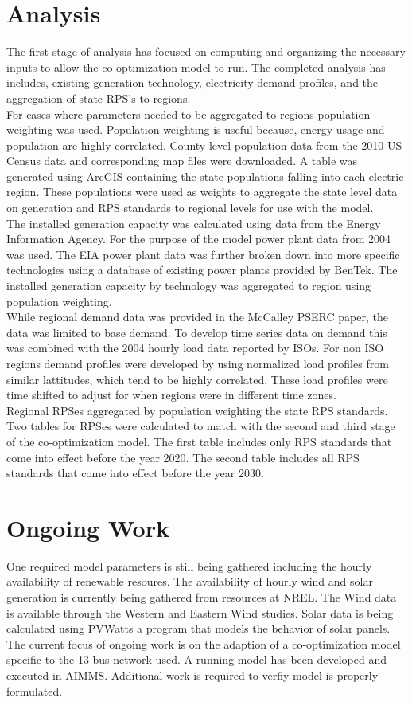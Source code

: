 \documentclass[oneside,12pt]{report}
\begin{document}
\chapter{Analysis}
The first stage of analysis has focused on computing and organizing the necessary inputs to allow the co-optimization model to run. The completed analysis has includes, existing generation technology, electricity demand profiles, and the aggregation of state RPS's to regions. 
\\For cases where parameters needed to be aggregated to regions population weighting was used. Population weighting is useful because, energy usage and population are highly correlated. County level population data from the 2010 US Census data and corresponding map files were downloaded. A table was generated using ArcGIS containing the state populations falling into each electric region. These populations were used as weights to aggregate the state level data on generation and RPS standards to regional levels for use with the model.
\\The installed generation capacity was calculated using data from the Energy Information Agency. For the purpose of the model power plant data from 2004 was used. The EIA power plant data was further broken down into more specific technologies using a database of existing power plants provided by BenTek. The installed generation capacity by technology was aggregated to region using population weighting.
\\While regional demand data was provided in the McCalley PSERC paper, the data was limited to base demand. To develop time series data on demand this was combined with the 2004 hourly load data reported by ISOs. For non ISO regions demand profiles were developed by using normalized load profiles from similar lattitudes, which tend to be highly correlated. These load profiles were time shifted to adjust for  when regions were in different time zones.
\\Regional RPSes aggregated by population weighting the state RPS standards. Two tables for RPSes were calculated to match with the second and third stage of the co-optimization model. The first table includes only RPS standards that come into effect before the year 2020. The second table includes all RPS standards that come into effect before the year 2030.

\chapter{Ongoing Work} 
One required model parameters is still being gathered including the hourly availability of renewable resoures. The availability of hourly wind and solar generation is currently being gathered from resources at NREL. The Wind data is available through the Western and Eastern Wind studies. Solar data is being calculated using PVWatts a program that models the behavior of solar panels.
\\The current focus of ongoing work is on the adaption of a co-optimization model specific to the 13 bus network used. A running model has been developed and executed in AIMMS. Additional work is required to verfiy model is properly formulated.
\end{document}

